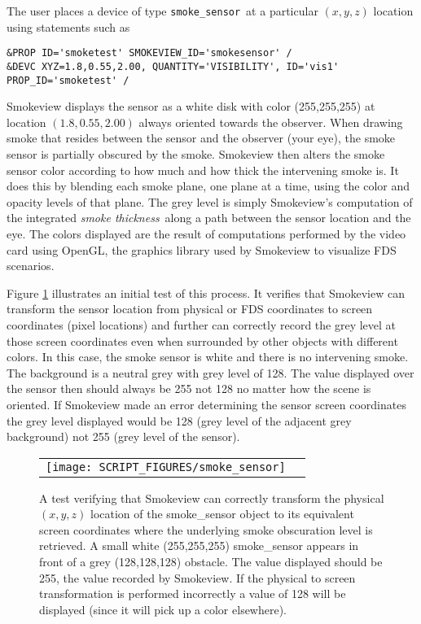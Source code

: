 \documentclass[11pt,twoside]{book}
\begin{document}
The user places a device of type {\tt smoke\_sensor}\ at a particular $(x, y, z)$ location using statements such as

{\small
\begin{verbatim}
&PROP ID='smoketest' SMOKEVIEW_ID='smokesensor' /
&DEVC XYZ=1.8,0.55,2.00, QUANTITY='VISIBILITY', ID='vis1' PROP_ID='smoketest' /
\end{verbatim}
}

Smokeview displays the sensor as a white disk with color (255,255,255) at location $(1.8,0.55,2.00)$
always oriented towards the observer. When drawing smoke that resides between
the sensor and the observer (your eye), the smoke sensor is partially obscured by the smoke.
Smokeview then alters the smoke sensor color according to how much and how thick the
intervening smoke is.  It does this by blending each smoke plane, one plane at a time, using
the color and opacity levels of that plane. The grey level is simply Smokeview's
computation of the integrated {\em smoke thickness}\ along a path between the sensor
location and the eye.  The colors displayed are the result of computations performed by the
video card using OpenGL, the graphics library used by Smokeview to visualize FDS scenarios.

Figure \ref{figsmokesensor} illustrates an initial test of this process.
It verifies that Smokeview can transform the sensor location from physical
or FDS coordinates to screen coordinates (pixel locations) and further
can correctly record the grey level at those screen coordinates even when
surrounded by other objects with different colors.
In this case, the smoke sensor is white and there is no intervening smoke.
The background is a neutral grey with grey level of 128.
The value displayed over the sensor then should always be 255 not 128 no matter
how the scene is oriented.
If Smokeview made an error determining the sensor screen coordinates the grey level
displayed would be 128 (grey level of the adjacent grey background) not 255
(grey level of the sensor).

\begin{figure}[bph]
\begin{center}
 \centering
\begin{tabular}{cc}
\texttt{[image: SCRIPT\_FIGURES/smoke\_sensor]}&
 \end{tabular}
\end{center}
\caption[A test verifying that the Smokeview smoke\_sensor object is working properly]
{A test verifying that Smokeview can correctly transform the physical $(x,y,z)$
location of the smoke\_sensor object to its equivalent screen coordinates where
the underlying smoke obscuration level is retrieved. A small white (255,255,255)
smoke\_sensor appears in front of a grey (128,128,128) obstacle. The value displayed
should be 255,  the value recorded by Smokeview.  If the physical to screen
transformation is performed incorrectly a value of 128 will be displayed (since it
will pick up a color elsewhere).
}
\label{figsmokesensor}%
\end{figure}
\end{document}

